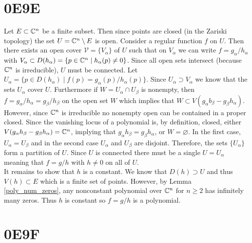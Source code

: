 \documentclass[12pt]{article}
\begin{document}
\section{0E9E}


Let $E \subset \mathbb{C}^n$ be a finite subset. Then since points are closed (in the Zariski topology) the set $U = \mathbb{C}^n \setminus E$ is open. Consider a regular function $f$ on $U$. Then there exists an open cover $\mathcal{V} = \{V_\alpha\}$ of $U$ such that on $V_\alpha$ we can write $f = g_\alpha / h_\alpha$ with $V_\alpha \subset D(h_\alpha) = \{p \in \mathbb{C}^n \mid h_\alpha(p) \neq 0 \}$. Since all open sets intersect (because $\mathbb{C}^n$ is irreducible), $U$ must be connected. Let $U_\alpha = \{ p \in D(h_\alpha) \mid f(p) = g_\alpha(p) / h_\alpha(p) \}$. Since $U_\alpha \supset V_\alpha$ we know that the sets $U_\alpha$ cover $U$. Furthermore if $W = U_\alpha \cap U_\beta$ is nonempty, then $f = g_\alpha / h_\alpha = g_\beta / h_\beta$ on the open set $W$ which implies that $W \subset V(g_\alpha b_\beta - g_\beta h_\alpha)$. However, since $\mathbb{C}^n$ is irreducible no nonempty open can be contained in a proper closed. Since the vanishing locus of a polynomial is, by definition, closed, either $V(g_\alpha h_\beta - g_\beta h_\alpha) = \mathbb{C}^n$, implying that $g_\alpha h_\beta = g_\beta h_\alpha$, or $W = \varnothing$. In the first case, $U_\alpha = U_\beta$ and in the second case $U_\alpha$ and $U_\beta$ are disjoint. Therefore, the sets $\{ U_\alpha \}$ form a partition of $U$. Since $U$ is connected there must be a single $U = U_\alpha$ meaning that $f = g / h$ with $h \neq 0$ on all of $U$.  
\bigskip\\
It remains to show that $h$ is a constant. We know that $D(h) \supset U$ and thus $V(h) \subset E$ which is a finite set of points. However, by Lemma \ref{poly_num_zeros}, any nonconstant polynomial over $\mathbb{C}^n$ for $n \ge 2$ has infinitely many zeros. Thus $h$ is constant so $f = g / h$ is a polynomial. 
\section{0E9F}
\end{document}
